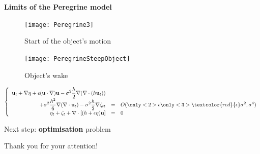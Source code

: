 \documentclass[compress,t]{beamer}
\begin{document}
		\begin{frame}
			\textbf{Limits of the Peregrine model}\\
			\begin{figure}
				\begin{minipage}[b]{0.4\linewidth}
					\texttt{[image: Peregrine3]}
					\caption{Start of the object's motion}
				\end{minipage}
				\hfill
				\begin{minipage}[b]{0.45\linewidth}
					\texttt{[image: PeregrineSteepObject]}
					\caption{Object's wake}
				\end{minipage}
			\end{figure}

			\pause
			\begin{center}
					$\left\lbrace
						\begin{array}{rll}
							\displaystyle \mathbf{u}_t + \nabla \eta + \epsilon (\mathbf{u} \cdot \nabla)\mathbf{u} - \sigma^2\frac{h}{2}\nabla (\nabla \cdot (h \mathbf{u}_t))
							& & \\
							+ \displaystyle \sigma^2 \frac{h^2}{6}\nabla (\nabla \cdot \mathbf{u}_t) - \sigma^2\frac{h}{2}\nabla \zeta_{tt} & = & \displaystyle O(\only<2>{\epsilon} \only<3>{\textcolor{red}{\mathbf{\epsilon}}} \sigma^2, \sigma^4) \\
							\displaystyle \eta_t+\zeta_t + \nabla \cdot [(h+\epsilon\eta)\mathbf{u}] & = & 0
						\end{array}
					\right.$ \\
				\end{center}
		\end{frame}
		
		\begin{frame}
			\centering 
			\vfill
				Next step: \textbf{optimisation} problem\\
				\vfill
			\begin{huge}
				Thank you for your attention!
			\end{huge}
			\vfill
		\end{frame}
\end{document}
